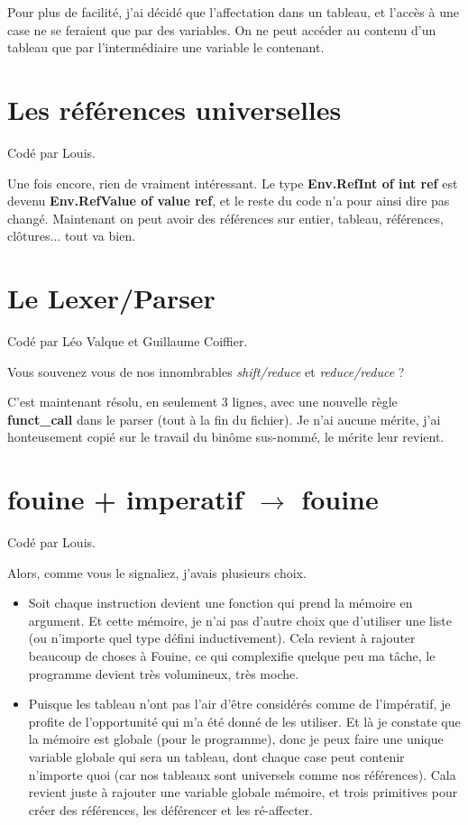 \documentclass[a4paper,10pt]{report}
\begin{document}
Pour plus de facilité, j'ai décidé que l'affectation dans un tableau, et l'accès à une case ne se feraient que par des variables. On ne peut accéder au contenu d'un tableau que par l'intermédiaire une variable le contenant. 
  
\section{Les références universelles}  

Codé par Louis.  
  
Une fois encore, rien de vraiment intéressant. Le type \textbf{Env.RefInt of int ref} est devenu \textbf{Env.RefValue of value ref}, et le reste du code n'a pour ainsi dire pas changé. Maintenant on peut avoir des références sur entier, tableau, références, clôtures... tout va bien.  
  
\section{Le Lexer/Parser}  
Codé par Léo Valque et Guillaume Coiffier.  
  
Vous souvenez vous de nos innombrables \textit{shift/reduce} et \textit{reduce/reduce} ?  
  
C'est maintenant résolu, en seulement 3 lignes, avec une nouvelle règle \textbf{funct\_{}call} dans le parser (tout à la fin du fichier). Je n'ai aucune mérite, j'ai honteusement copié sur le travail du binôme sus-nommé, le mérite leur revient.  

\newpage
  
\section{fouine + imperatif $\rightarrow$ fouine}  
Codé par Louis.  
  
Alors, comme vous le signaliez, j'avais plusieurs choix.  

\begin{itemize}
\item Soit chaque instruction devient une fonction qui prend la mémoire en argument. Et cette mémoire, je n'ai pas d'autre choix que d'utiliser une liste (ou n'importe quel type défini inductivement). Cela revient à rajouter beaucoup de choses à Fouine, ce qui complexifie quelque peu ma tâche, le programme devient très volumineux, très moche. 
\item Puisque les tableau n'ont pas l'air d'être considérés comme de l'impératif, je profite de l'opportunité qui m'a été donné de les utiliser. Et là je constate que la mémoire est globale (pour le programme), donc je peux faire une unique variable globale qui sera un tableau, dont chaque case peut contenir n'importe quoi (car nos tableaux sont universels comme nos références). Cala revient juste à rajouter une variable globale mémoire, et trois primitives pour créer des références, les déférencer et les ré-affecter.  
\end{itemize}
\end{document}
